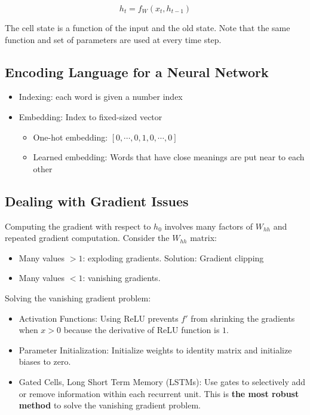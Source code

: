 \documentclass[12pt, a4paper, oneside]{article}
\begin{document}
\begin{equation*}
    h_{t}=f_{W}(x_{t},h_{t-1})
\end{equation*}

The cell state is a function of the input and the old state. Note that the same function and set of parameters are used at every time step.

\subsection{Encoding Language for a Neural Network}

\begin{itemize}
    \item Indexing: each word is given a number index
    \item Embedding: Index to fixed-sized vector
    \begin{itemize}
        \item One-hot embedding: $[0,\cdots,0,1,0,\cdots,0]$
        \item Learned embedding: Words that have close meanings are put near to each other
    \end{itemize}
\end{itemize}

\subsection{Dealing with Gradient Issues}

Computing the gradient with respect to $h_{0}$ involves many factors of $W_{hh}$ and repeated gradient computation. Consider the $W_{hh}$ matrix:

\begin{itemize}
    \item Many values $>1$: exploding gradients. Solution: Gradient clipping
    \item Many values $<1$: vanishing gradients.
\end{itemize}

Solving the vanishing gradient problem:

\begin{itemize}
    \item Activation Functions: Using ReLU prevents $f'$ from shrinking the gradients when $x>0$ because the derivative of ReLU function is $1$.
    \item Parameter Initialization: Initialize weights to identity matrix and initialize biases to zero.
    \item Gated Cells, Long Short Term Memory (LSTMs): Use gates to selectively add or remove information within each recurrent unit. This is \textbf{the most robust method} to solve the vanishing gradient problem.
\end{itemize}
\end{document}
